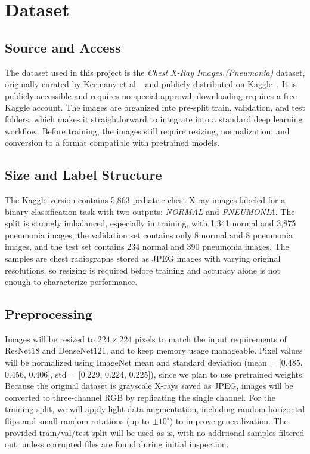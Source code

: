 \documentclass[acmsmall,screen,nonacm]{acmart}
\begin{document}
\section{Dataset}

\subsection{Source and Access}
The dataset used in this project is the \textit{Chest X-Ray Images (Pneumonia)} dataset, originally curated by Kermany et al.~\cite{kermany2018} and publicly distributed on Kaggle~\cite{kagglechestxray}. It is publicly accessible and requires no special approval; downloading requires a free Kaggle account. The images are organized into pre-split train, validation, and test folders, which makes it straightforward to integrate into a standard deep learning workflow. Before training, the images still require resizing, normalization, and conversion to a format compatible with pretrained models.

\subsection{Size and Label Structure}
The Kaggle version contains 5,863 pediatric chest X-ray images labeled for a binary classification task with two outputs: \textit{NORMAL} and \textit{PNEUMONIA}. The split is strongly imbalanced, especially in training, with 1,341 normal and 3,875 pneumonia images; the validation set contains only 8 normal and 8 pneumonia images, and the test set contains 234 normal and 390 pneumonia images. The samples are chest radiographs stored as JPEG images with varying original resolutions, so resizing is required before training and accuracy alone is not enough to characterize performance.

\subsection{Preprocessing}
Images will be resized to $224 \times 224$ pixels to match the input requirements of ResNet18 and DenseNet121, and to keep memory usage manageable. Pixel values will be normalized using ImageNet mean and standard deviation (mean = [0.485, 0.456, 0.406], std = [0.229, 0.224, 0.225]), since we plan to use pretrained weights. Because the original dataset is grayscale X-rays saved as JPEG, images will be converted to three-channel RGB by replicating the single channel. For the training split, we will apply light data augmentation, including random horizontal flips and small random rotations (up to  $\pm 10^\circ$) to improve generalization. The provided train/val/test split will be used as-is, with no additional samples filtered out, unless corrupted files are found during initial inspection.
\end{document}

